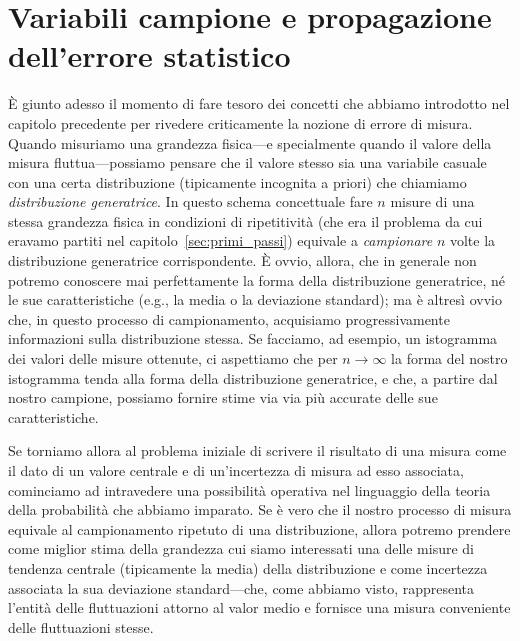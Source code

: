 \chapter{Variabili campione e propagazione dell'errore statistico}
\label{sec:teoria_dei_campioni}

\`E giunto adesso il momento di fare tesoro dei concetti che abbiamo
introdotto nel capitolo precedente per rivedere criticamente la nozione di
errore di misura. Quando misuriamo una grandezza fisica---e specialmente quando
il valore della misura fluttua---possiamo pensare che il valore stesso sia
una variabile casuale con una certa distribuzione (tipicamente incognita a
priori) che chiamiamo \emph{distribuzione generatrice}. In questo schema
concettuale fare $n$ misure di una stessa grandezza fisica in condizioni di
ripetitività (che era il problema da cui eravamo partiti nel
capitolo~\ref{sec:primi_passi}) equivale a \emph{campionare} $n$ volte la
distribuzione generatrice corrispondente. \`E ovvio, allora, che in generale
non potremo conoscere mai perfettamente la forma della distribuzione
generatrice, né le sue caratteristiche (e.g., la media o la deviazione
standard); ma è altresì ovvio che, in questo processo di campionamento,
acquisiamo progressivamente informazioni sulla distribuzione stessa.
Se facciamo, ad esempio, un istogramma dei valori delle misure ottenute, ci
aspettiamo che per $n \rightarrow \infty$ la forma del nostro istogramma tenda
alla forma della distribuzione generatrice, e che, a partire dal nostro
campione, possiamo fornire stime via via più accurate delle sue
caratteristiche.

Se torniamo allora al problema iniziale di scrivere il risultato di una misura
come il dato di un valore centrale e di un'incertezza di misura ad esso
associata, cominciamo ad intravedere una possibilità operativa nel linguaggio
della teoria della probabilità che abbiamo imparato. Se è vero che il nostro
processo di misura equivale al campionamento ripetuto di una distribuzione,
allora potremo prendere come miglior stima della grandezza cui siamo
interessati una delle misure di tendenza centrale (tipicamente la media) della
distribuzione e come incertezza associata la sua deviazione standard---che,
come abbiamo visto, rappresenta l'entità delle fluttuazioni attorno al valor
medio e fornisce una misura conveniente delle fluttuazioni stesse.

